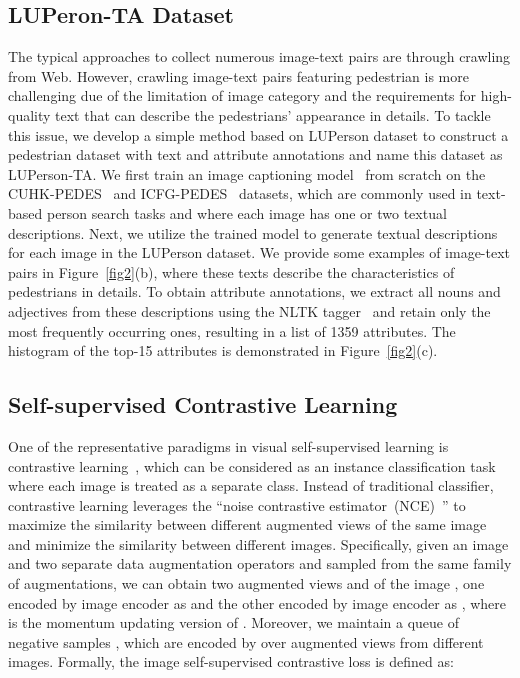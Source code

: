 \documentclass[final]{cvpr}
\begin{document}
\subsection{LUPeron-TA Dataset}
The typical approaches\cite{radford2021learning,jia2021scaling,schuhmann2021laion} to collect numerous image-text pairs are through crawling from Web.
However, crawling image-text pairs featuring pedestrian is more challenging due of the limitation of image category and the requirements for high-quality text that can describe the pedestrians' appearance in details.
To tackle this issue, we develop a simple method based on LUPerson dataset to construct a pedestrian dataset with text and attribute annotations and name this dataset as LUPerson-TA.
We first train an image captioning model~\cite{xu2015show} from scratch on the CUHK-PEDES~\cite{li2017person} and ICFG-PEDES~\cite{ding2021semantically} datasets, which are commonly used in text-based person search tasks and where each image has one or two textual descriptions.
Next, we utilize the trained model to generate textual descriptions for each image in the LUPerson dataset.
We provide some examples of image-text pairs in Figure~\ref{fig2}(b),
where these texts describe the characteristics of pedestrians in details.
To obtain attribute annotations, we extract all nouns and adjectives from these descriptions using the NLTK tagger~\cite{bird2009nltk} and retain only the most frequently occurring ones, resulting in a list of 1359 attributes. 
The histogram of the top-15 attributes is demonstrated in Figure~\ref{fig2}(c).



\subsection{Self-supervised Contrastive Learning}
One of the representative paradigms in visual self-supervised learning is contrastive learning~\cite{he2020momentum,chen2020simple,wu2018unsupervised}, which can be considered as an instance classification task where each image is treated as a separate class. 
Instead of traditional classifier, contrastive learning leverages the ``noise contrastive estimator~(NCE)~\cite{gutmann2010noise}'' to maximize the similarity between different augmented views of the same image and minimize the similarity between different images.
Specifically, given an image  and two separate data augmentation operators  and  sampled from the same family of augmentations, we can obtain two augmented views  and  of the image , one encoded by image encoder  as  and the other encoded by image encoder  as , where  is the momentum updating version of .
Moreover, we maintain a queue of negative samples , which are encoded by  over augmented views from different images.
Formally, the image self-supervised contrastive loss is defined as: \par
\vspace{-2mm}
\begin{small}

\end{small}
\end{document}
